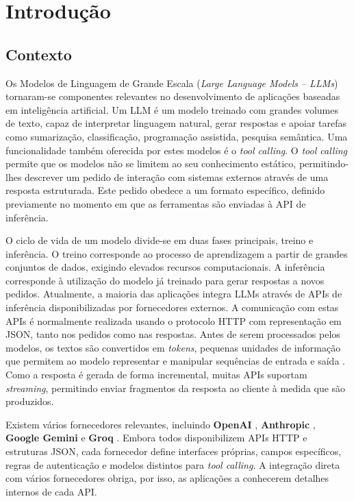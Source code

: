     \chapter{Introdução}

    \section{Contexto}
    Os Modelos de Linguagem de Grande Escala (\textit{Large Language Models -- LLMs}) \cite{ibm_llm_topics} tornaram-se componentes relevantes no desenvolvimento de aplicações baseadas em inteligência artificial. Um LLM é um modelo treinado com grandes volumes de texto, capaz de interpretar linguagem natural, gerar respostas e apoiar tarefas como sumarização, classificação, programação assistida, pesquisa semântica. Uma funcionalidade também oferecida por estes modelos é o \textit{tool calling}\cite{ibm_tool_calling}\cite{toolCallingCycle}. O \textit{tool calling} permite que os modelos não se limitem ao seu conhecimento estático, permitindo-lhes descrever um pedido de interação com sistemas externos através de uma resposta estruturada. Este pedido obedece a um formato específico, definido previamente no momento em que as ferramentas são enviadas à API de inferência.

    O ciclo de vida de um modelo divide-se em duas fases principais, treino e inferência. O treino corresponde ao processo de aprendizagem a partir de grandes conjuntos de dados, exigindo elevados recursos computacionais. A inferência corresponde à utilização do modelo já treinado para gerar respostas a novos pedidos. Atualmente, a maioria das aplicações integra LLMs através de APIs de inferência disponibilizadas por fornecedores externos. A comunicação com estas APIs é normalmente realizada usando o protocolo HTTP com representação em JSON, tanto nos pedidos como nas respostas. Antes de serem processados pelos modelos, os textos são convertidos em \textit{tokens}, pequenas unidades de informação que permitem ao modelo representar e manipular sequências de entrada e saída \cite{nvidia_tokens}. Como a resposta é gerada de forma incremental, muitas APIs suportam \textit{streaming}, permitindo enviar fragmentos da resposta ao cliente à medida que são produzidos.

    Existem vários fornecedores relevantes, incluindo \textbf{OpenAI} \cite{openai_api}, \textbf{Anthropic} \cite{anthropic_api}, \textbf{Google Gemini} \cite{google_gemini_api} e \textbf{Groq} \cite{groq_api}. Embora todos disponibilizem APIs HTTP e estruturas JSON, cada fornecedor define interfaces próprias, campos específicos, regras de autenticação e modelos distintos para \textit{tool calling}. A integração direta com vários fornecedores obriga, por isso, as aplicações a conhecerem detalhes internos de cada API.

